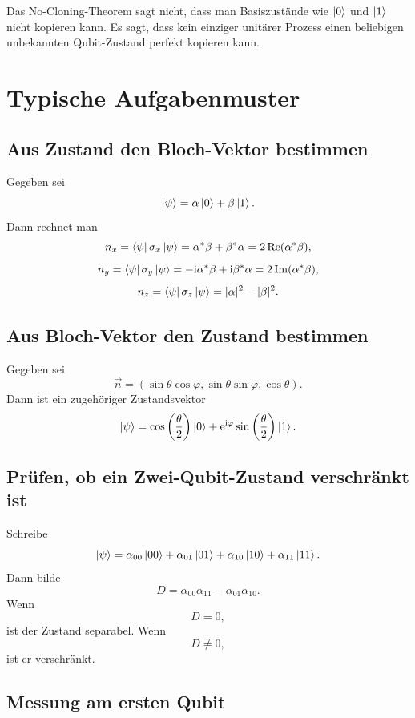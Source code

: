 \begin{conceptbox}
Das No-Cloning-Theorem sagt nicht, dass man Basiszustände wie \(\left|0\right\rangle\) und \(\left|1\right\rangle\) nicht kopieren kann. Es sagt, dass kein einziger unitärer Prozess einen beliebigen unbekannten Qubit-Zustand perfekt kopieren kann.
\end{conceptbox}

\section{Typische Aufgabenmuster}

\subsection{Aus Zustand den Bloch-Vektor bestimmen}

Gegeben sei
\[
    \left|\psi\right\rangle=\alpha\left|0\right\rangle+\beta\left|1\right\rangle.
\]
Dann rechnet man
\[
    n_x=\left\langle\psi\right|\sigma_x\left|\psi\right\rangle=\alpha^*\beta+\beta^*\alpha=2\operatorname{Re}(\alpha^*\beta),
\]
\[
    n_y=\left\langle\psi\right|\sigma_y\left|\psi\right\rangle=-\mathrm{i}\alpha^*\beta+\mathrm{i}\beta^*\alpha=2\operatorname{Im}(\alpha^*\beta),
\]
\[
    n_z=\left\langle\psi\right|\sigma_z\left|\psi\right\rangle=|\alpha|^2-|\beta|^2.
\]

\subsection{Aus Bloch-Vektor den Zustand bestimmen}

Gegeben sei
\[
    \vec n=(\sin\theta\cos\varphi,\sin\theta\sin\varphi,\cos\theta).
\]
Dann ist ein zugehöriger Zustandsvektor
\[
    \left|\psi\right\rangle
    =\cos\left(\frac\theta2\right)\left|0\right\rangle
    +\mathrm{e}^{\mathrm{i}\varphi}\sin\left(\frac\theta2\right)\left|1\right\rangle.
\]

\subsection{Prüfen, ob ein Zwei-Qubit-Zustand verschränkt ist}

Schreibe
\[
    \left|\psi\right\rangle
    =\alpha_{00}\left|00\right\rangle+\alpha_{01}\left|01\right\rangle
    +\alpha_{10}\left|10\right\rangle+\alpha_{11}\left|11\right\rangle.
\]
Dann bilde
\[
    D=\alpha_{00}\alpha_{11}-\alpha_{01}\alpha_{10}.
\]
Wenn
\[
    D=0,
\]
ist der Zustand separabel. Wenn
\[
    D\neq 0,
\]
ist er verschränkt.

\subsection{Messung am ersten Qubit}

